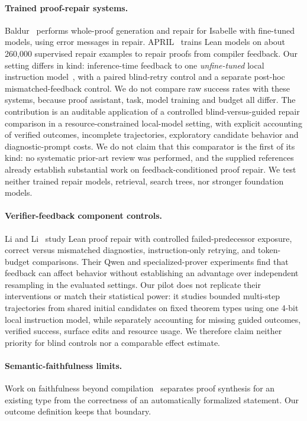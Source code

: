 \documentclass[runningheads,a4paper]{llncs}
\begin{document}
\paragraph{Trained proof-repair systems.} Baldur~\cite{first2023baldur} performs
whole-proof generation and repair for Isabelle with fine-tuned models, using error
messages in repair. APRIL~\cite{wang2026april} trains Lean models on about 260,000
supervised repair examples to repair proofs from compiler feedback. Our setting
differs in kind: inference-time feedback to one \emph{unfine-tuned} local instruction
model~\cite{qwen2024report}, with a paired blind-retry control and a separate
post-hoc mismatched-feedback control. We do not compare raw success rates with
these systems, because proof assistant, task, model training and budget all
differ. The contribution is an auditable application of a controlled blind-versus-guided repair comparison in a resource-constrained local-model setting, with explicit accounting of verified outcomes, incomplete trajectories, exploratory candidate behavior and diagnostic-prompt costs. We do not claim that this comparator is the first of its kind: no systematic prior-art review was performed, and the supplied references already establish substantial work on feedback-conditioned proof repair. We test neither trained
repair models, retrieval, search trees, nor stronger foundation models.

\paragraph{Verifier-feedback component controls.} Li and Li~\cite{li2026hindsight}
study Lean proof repair with controlled failed-predecessor exposure,
correct versus mismatched diagnostics, instruction-only retrying, and
token-budget comparisons. Their Qwen and specialized-prover experiments
find that feedback can affect behavior without establishing an advantage
over independent resampling in the evaluated settings. Our pilot does not
replicate their interventions or match their statistical power: it studies
bounded multi-step trajectories from shared initial candidates on fixed
theorem types using one 4-bit local instruction model, while separately
accounting for missing guided outcomes, verified success, surface edits
and resource usage. We therefore claim neither priority for blind controls
nor a comparable effect estimate.

\paragraph{Semantic-faithfulness limits.} Work on faithfulness beyond
compilation~\cite{zhang2026beyond} separates proof synthesis for an existing type
from the correctness of an automatically formalized statement. Our outcome
definition keeps that boundary.
\end{document}
